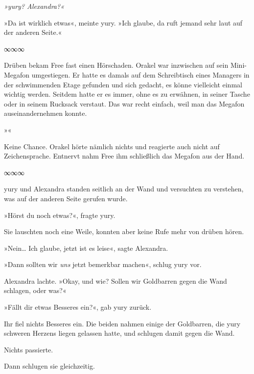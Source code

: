     \begin{footnotesize}

\textit{»yury? Alexandra?«}

    \end{footnotesize}

»Da ist wirklich etwas«, meinte yury. »Ich glaube, da ruft jemand sehr laut auf der anderen Seite.«

\begin{center}
    ∞∞∞
\end{center}

Drüben bekam Free fast einen Hörschaden. Orakel war inzwischen auf sein Mini-Megafon umgestiegen. Er hatte es damals auf dem Schreibtisch eines Managers in der schwimmenden Etage gefunden und sich gedacht, es könne vielleicht einmal wichtig werden. Seitdem hatte er es immer, ohne es zu erwähnen, in seiner Tasche oder in seinem Rucksack verstaut. Das war recht einfach, weil man das Megafon auseinandernehmen konnte.

»«

Keine Chance. Orakel hörte nämlich nichts und reagierte auch nicht auf Zeichensprache. Entnervt nahm Free ihm schließlich das Megafon aus der Hand.

\begin{center}
    ∞∞∞
\end{center}

yury und Alexandra standen seitlich an der Wand und versuchten zu verstehen, was auf der anderen Seite gerufen wurde.

»Hörst du noch etwas?«, fragte yury.

Sie lauschten noch eine Weile, konnten aber keine Rufe mehr von drüben hören.

»Nein… Ich glaube, jetzt ist es leise«, sagte Alexandra.

»Dann sollten wir \emph{uns} jetzt bemerkbar machen«, schlug yury vor.

Alexandra lachte. »Okay, und wie? Sollen wir Goldbarren gegen die Wand schlagen, oder was?«

»Fällt dir etwas Besseres ein?«, gab yury zurück.

Ihr fiel nichts Besseres ein. Die beiden nahmen einige der Goldbarren, die yury schweren Herzens liegen gelassen hatte, und schlugen damit gegen die Wand.

Nichts passierte.

Dann schlugen sie gleichzeitig.

